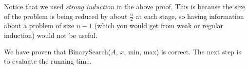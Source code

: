 \documentclass[twoside]{article}
\begin{document}
Notice that we used {\em strong induction} in the above proof. This is
because the size of the problem is being reduced by about $\frac{n}{2}$
at each stage, so having information about a problem of size $n-1$
(which you would get from weak or regular induction) would not be
useful.

We have proven that {\sc BinarySearch($A$, $x$, min, max)} is
correct. The next step is to evaluate the running time. 
\end{document}
